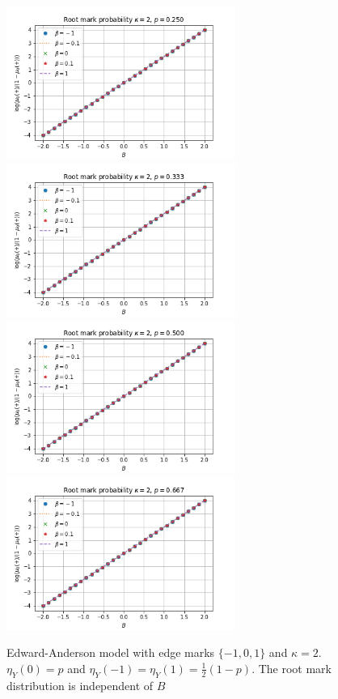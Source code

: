 \documentclass[12pt]{article}
\numberwithin{equation}{section}
\begin{document}
\begin{figure}[h]
    \centering
    \includegraphics[width=7.5cm]{img/EA_x0_B_logi_kappa_2_3s_p=0.25.png}
    \includegraphics[width=7.5cm]{img/EA_x0_B_logi_kappa_2_3s_p=0.33.png}
    \includegraphics[width=7.5cm]{img/EA_x0_B_logi_kappa_2_3s_p=0.50.png}
    \includegraphics[width=7.5cm]{img/EA_x0_B_logi_kappa_2_3s_p=0.67.png}
    \caption{Edward-Anderson model with edge marks $\{-1, 0, 1\}$ and $\kappa=2$. $\eta_Y(0)=p$ and $\eta_Y(-1)=\eta_Y(1)=\frac12(1-p)$. The root mark distribution is independent of $B$}
    \label{Fig.EA-RM-k2-3s}
\end{figure}
\end{document}

